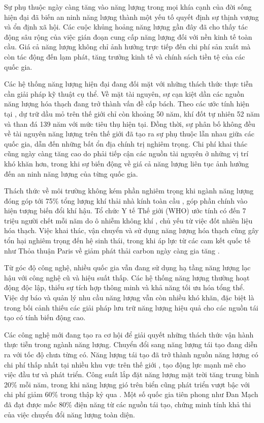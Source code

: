 \documentclass[../main.tex]{subfiles}
\begin{document}
Sự phụ thuộc ngày càng tăng vào năng lượng trong mọi khía cạnh của đời sống hiện đại đã biến an ninh năng lượng thành một yếu tố quyết định sự thịnh vượng và ổn định xã hội. Các cuộc khủng hoảng năng lượng gần đây đã cho thấy tác động sâu rộng của việc gián đoạn cung cấp năng lượng đối với nền kinh tế toàn cầu. Giá cả năng lượng không chỉ ảnh hưởng trực tiếp đến chi phí sản xuất mà còn tác động đến lạm phát, tăng trưởng kinh tế và chính sách tiền tệ của các quốc gia.

Các hệ thống năng lượng hiện đại đang đối mặt với những thách thức thực tiễn cần giải pháp kỹ thuật cụ thể. Về mặt tài nguyên, sự cạn kiệt dần các nguồn năng lượng hóa thạch đang trở thành vấn đề cấp bách. Theo các ước tính hiện tại \cite{bp2023statistical}, dự trữ dầu mỏ trên thế giới chỉ còn khoảng 50 năm, khí đốt tự nhiên 52 năm và than đá 139 năm với mức tiêu thụ hiện tại. Đồng thời, sự phân bố không đều về tài nguyên năng lượng trên thế giới đã tạo ra sự phụ thuộc lẫn nhau giữa các quốc gia, dẫn đến những bất ổn địa chính trị nghiêm trọng. Chi phí khai thác cũng ngày càng tăng cao do phải tiếp cận các nguồn tài nguyên ở những vị trí khó khăn hơn, trong khi sự biến động về giá cả năng lượng liên tục ảnh hưởng đến an ninh năng lượng của từng quốc gia.

Thách thức về môi trường không kém phần nghiêm trọng khi ngành năng lượng đóng góp tới 75\% tổng lượng khí thải nhà kính toàn cầu \cite{ipcc2022mitigation}, góp phần chính vào hiện tượng biến đổi khí hậu. Tổ chức Y tế Thế giới (WHO) ước tính có đến 7 triệu người chết mỗi năm do ô nhiễm không khí \cite{who2021ambient}, chủ yếu từ việc đốt nhiên liệu hóa thạch. Việc khai thác, vận chuyển và sử dụng năng lượng hóa thạch cũng gây tổn hại nghiêm trọng đến hệ sinh thái, trong khi áp lực từ các cam kết quốc tế như Thỏa thuận Paris về giảm phát thải carbon ngày càng gia tăng \cite{unfccc2015paris}.

Từ góc độ công nghệ, nhiều quốc gia vẫn đang sử dụng hạ tầng năng lượng lạc hậu với công nghệ cũ và hiệu suất thấp. Các hệ thống năng lượng thường hoạt động độc lập, thiếu sự tích hợp thông minh và khả năng tối ưu hóa tổng thể. Việc dự báo và quản lý nhu cầu năng lượng vẫn còn nhiều khó khăn, đặc biệt là trong bối cảnh thiếu các giải pháp lưu trữ năng lượng hiệu quả cho các nguồn tái tạo có tính biến động cao.

Các công nghệ mới đang tạo ra cơ hội để giải quyết những thách thức vận hành thực tiễn trong ngành năng lượng. Chuyển đổi sang năng lượng tái tạo đang diễn ra với tốc độ chưa từng có. Năng lượng tái tạo đã trở thành nguồn năng lượng có chi phí thấp nhất tại nhiều khu vực trên thế giới \cite{irena2023renewable}, tạo động lực mạnh mẽ cho việc đầu tư và phát triển. Công suất lắp đặt năng lượng mặt trời tăng trung bình 20\% mỗi năm, trong khi năng lượng gió trên biển cũng phát triển vượt bậc với chi phí giảm 60\% trong thập kỷ qua \cite{iea2023offshore}. Một số quốc gia tiên phong như Đan Mạch đã đạt được mốc 80\% điện năng từ các nguồn tái tạo, chứng minh tính khả thi của việc chuyển đổi năng lượng toàn diện.
\end{document}
